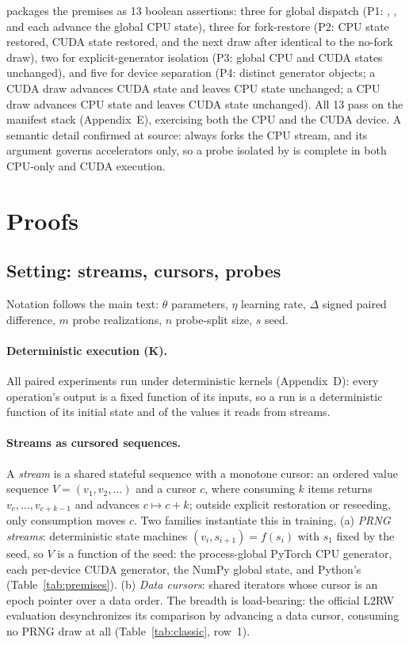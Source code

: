  packages the premises as 13 boolean
assertions: three for global dispatch (P1: ,
, and  each advance the global CPU state),
three for fork-restore (P2: CPU state restored, CUDA state restored, and
the next draw after  identical to the no-fork draw), two
for explicit-generator isolation (P3: global CPU and CUDA states
unchanged), and five for device separation (P4: distinct generator
objects; a CUDA draw advances CUDA state and leaves CPU state unchanged;
a CPU draw advances CPU state and leaves CUDA state unchanged). All 13
pass on the manifest stack (Appendix~E), exercising both the CPU and the
CUDA device. A semantic detail confirmed at source: 
always forks the CPU stream, and its  argument governs
accelerators only, so a probe isolated by  is complete in
both CPU-only and CUDA execution.

\section{Proofs}
\label{sec:proofs}

\subsection{Setting: streams, cursors, probes}
\label{sec:setting}

Notation follows the main text: $\theta$ parameters, $\eta$ learning
rate, $\Delta$ signed paired difference, $m$ probe realizations, $n$
probe-split size, $s$ seed.

\paragraph{Deterministic execution (K).}
All paired experiments run under deterministic kernels (Appendix~D):
every operation's output is a fixed function of its inputs, so a run is a
deterministic function of its initial state and of the values it reads
from streams.

\paragraph{Streams as cursored sequences.}
A \emph{stream} is a shared stateful sequence with a monotone cursor: an
ordered value sequence $V = (v_1, v_2, \dots)$ and a cursor $c$, where
consuming $k$ items returns $v_c, \dots, v_{c+k-1}$ and advances
$c \mapsto c + k$; outside explicit restoration or reseeding,
only consumption moves $c$. Two families instantiate
this in training. (a) \emph{PRNG streams}: deterministic state machines
$(v_i, s_{i+1}) = f(s_i)$ with $s_1$ fixed by the seed, so $V$ is a
function of the seed: the process-global PyTorch CPU generator, each
per-device CUDA generator, the NumPy global state, and Python's
 (Table~\ref{tab:premises}). (b) \emph{Data cursors}: shared
iterators whose cursor is an epoch pointer over a data order. The breadth
is load-bearing: the official L2RW evaluation desynchronizes its
comparison by advancing a data cursor, consuming no PRNG draw at all
(Table~\ref{tab:classic}, row~1).

